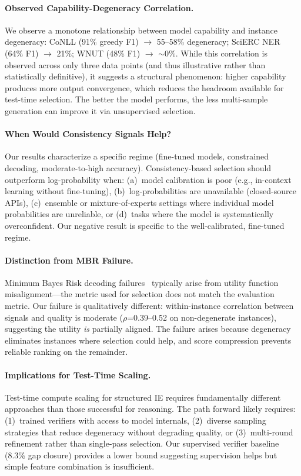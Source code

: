 \documentclass[11pt,a4paper]{article}
\begin{document}
\paragraph{Observed Capability-Degeneracy Correlation.}
We observe a monotone relationship between model capability and instance degeneracy: CoNLL (91\% greedy F1) $\to$ 55--58\% degeneracy; SciERC NER (64\% F1) $\to$ 21\%; WNUT (48\% F1) $\to$ $\sim$0\%.
While this correlation is observed across only three data points (and thus illustrative rather than statistically definitive), it suggests a structural phenomenon: higher capability produces more output convergence, which reduces the headroom available for test-time selection.
The better the model performs, the less multi-sample generation can improve it via unsupervised selection.

\paragraph{When Would Consistency Signals Help?}
Our results characterize a specific regime (fine-tuned models, constrained decoding, moderate-to-high accuracy).
Consistency-based selection should outperform log-probability when:
(a)~model calibration is poor (e.g., in-context learning without fine-tuning),
(b)~log-probabilities are unavailable (closed-source APIs),
(c)~ensemble or mixture-of-experts settings where individual model probabilities are unreliable, or
(d)~tasks where the model is systematically overconfident.
Our negative result is specific to the well-calibrated, fine-tuned regime.

\paragraph{Distinction from MBR Failure.}
Minimum Bayes Risk decoding failures~\citep{eikema2020mbr} typically arise from utility function misalignment---the metric used for selection does not match the evaluation metric.
Our failure is qualitatively different: within-instance correlation between signals and quality is moderate ($\rho$=0.39--0.52 on non-degenerate instances), suggesting the utility \emph{is} partially aligned.
The failure arises because degeneracy eliminates instances where selection could help, and score compression prevents reliable ranking on the remainder.

\paragraph{Implications for Test-Time Scaling.}
Test-time compute scaling for structured IE requires fundamentally different approaches than those successful for reasoning.
The path forward likely requires: (1)~trained verifiers with access to model internals, (2)~diverse sampling strategies that reduce degeneracy without degrading quality, or (3)~multi-round refinement rather than single-pass selection.
Our supervised verifier baseline (8.3\% gap closure) provides a lower bound suggesting supervision helps but simple feature combination is insufficient.
\end{document}
